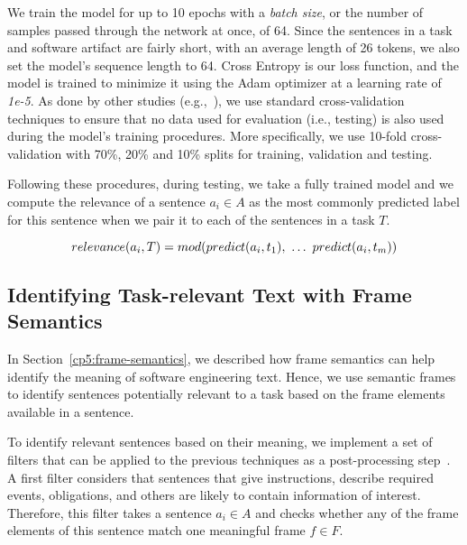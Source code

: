 We train the model for up to 10 epochs with a \textit{batch size}, or the number of samples passed through the network at once, of 64. Since the sentences in a task and software artifact are fairly short, with an average length of 26 tokens, we also set the model's sequence length to 64. Cross Entropy is our loss function, and the model is trained to minimize it using the Adam optimizer at a learning rate of \textit{1e-5}.
As done by other studies (e.g.,~\cite{Chaparro2017, fucci2019, Petrosyan2015}), we use standard cross-validation techniques to ensure  that no data used for evaluation (i.e., testing) is also used
during the model's training procedures. More specifically, we use 10-fold cross-validation with 70\%, 20\% and 10\% splits for training, validation and testing. 




Following these procedures, during testing, we take a fully trained model and we compute the relevance of a sentence $a_i \in A$ as the most commonly predicted label for this sentence when we pair it to each of the sentences in a task $T$.

\begin{equation}
    relevance(a_i, T) = mod(predict(a_i, t_1), ~\dots~ predict(a_i, t_m)) \\
\end{equation}





\subsection{Identifying Task-relevant Text with Frame Semantics}






In Section~\ref{cp5:frame-semantics}, we described how frame semantics can help identify the meaning of software engineering text. Hence, we use semantic frames to identify sentences potentially relevant to a task based on the frame elements available in a sentence.



To identify relevant sentences based on their meaning, we implement a set of filters that can be applied to the previous techniques as a post-processing step~\cite{Manning2009IR}.
A first filter considers that sentences that give instructions, describe required events, obligations, and others are likely to contain information of interest. Therefore, this filter takes a sentence $a_i \in A$ and checks whether any of the frame elements of this sentence match one meaningful frame $f \in F$. 




